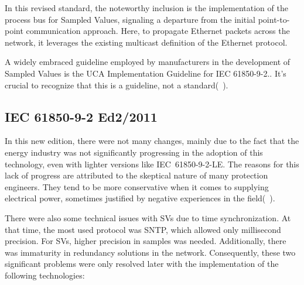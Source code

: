 In this revised standard, the noteworthy inclusion is the implementation of the process bus for Sampled Values, signaling a departure from the initial point-to-point communication approach. Here, to propagate Ethernet packets across the network, it leverages the existing multicast definition of the Ethernet protocol.

A widely embraced guideline employed by manufacturers in the development of Sampled Values is the UCA Implementation Guideline for IEC 61850-9-2.. It's crucial to recognize that this is a guideline, not a standard(~\cite{History_Sample_Value}).

\subsection{IEC 61850-9-2 Ed2/2011}

In this new edition, there were not many changes, mainly due to the fact that the energy industry was not significantly progressing in the adoption of this technology, even with lighter versions like IEC~61850-9-2-LE. The reasons for this lack of progress are attributed to the skeptical nature of many protection engineers. They tend to be more conservative when it comes to supplying electrical power, sometimes justified by negative experiences in the field(~\cite{History_Sample_Value}).

There were also some technical issues with SVs due to time synchronization. At that time, the most used protocol was SNTP, which allowed only millisecond precision. For SVs, higher precision in samples was needed. Additionally, there was immaturity in redundancy solutions in the network. Consequently, these two significant problems were only resolved later with the implementation of the following technologies:

